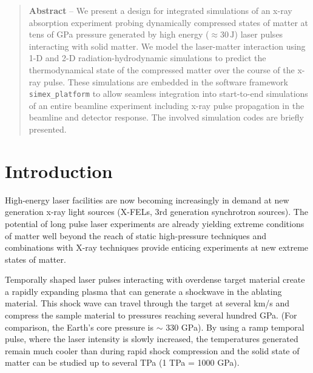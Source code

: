 \documentclass[10pt]{scrartcl}
\begin{document}
\tableofcontents

\begin{abstract}
  \noindent%
  \textbf{Abstract} -- We present a design for integrated simulations of an x-ray absorption
  experiment probing dynamically compressed states of matter at tens of GPa pressure generated by
  high energy ($\approx 30\,\text{J}$) laser pulses interacting with solid matter.
  We model the laser-matter interaction using 1-D and 2-D radiation-hydrodynamic simulations to predict
  the thermodynamical state of the compressed matter over the course of the x-ray pulse. These simulations
  are embedded in the software framework \texttt{simex\_platform} to allow seamless integration into
  start-to-end simulations of an entire beamline experiment including x-ray pulse propagation in the beamline and
  detector response. The involved simulation codes are briefly presented.
\end{abstract}
%
\section{Introduction}
High-energy laser facilities are now becoming increasingly in demand at new
generation x-ray light sources (X-FELs, 3rd generation synchrotron sources). The
potential of long pulse laser experiments are already yielding extreme
conditions of matter well beyond the reach of static high-pressure techniques
and combinations with X-ray techniques provide enticing experiments at new
extreme states of matter.

Temporally shaped laser pulses interacting with overdense target material create
a rapidly expanding plasma that can generate a shockwave in the ablating
material. This shock wave can travel through the target at several km/s and
compress the sample material to pressures reaching several hundred GPa. (For
comparison, the Earth's core pressure is $\sim$ 330 GPa). By using a ramp
temporal pulse, where the laser intensity is slowly increased, the temperatures
generated remain much cooler than during rapid shock compression and the solid
state of matter can be studied up to several TPa (1 TPa = 1000 GPa).
\end{document}
